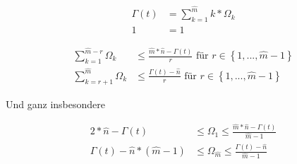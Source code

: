 \vspace{0.6cm}
\vspace{1cm}













\begin{Theorem}\label{theremPartiotionVsGamma}
\vspace{0.3cm}

\begin{align*}
\Gamma(t)&= \sum_{k=1}^{\widehat{m}} k * \Omega_k \tag{i} \\ 
1 &= 1 \tag{ii} 
\end{align*}

\end{Theorem}
\vspace{0.3cm}


\begin{Theorem}\label{theremAbschaetzung}
\vspace{0.3cm}

\begin{align*}
\sum_{k=1}^{\widehat{m} - r} \Omega_k &\leq \frac{\widehat{m} * \widehat{n} - \Gamma(t)}{r} \textrm{ für } r \in \left\{1,...,\widehat{m} - 1 \right\} \tag{i} \\ 
\sum_{k=r+1}^{\widehat{m}} \Omega_k &\leq \frac{\Gamma(t) - \widehat{n}}{r} \textrm{ für } r \in \left\{1,...,\widehat{m} - 1 \right\} \tag{ii} 
\end{align*}

Und ganz insbesondere

\begin{align*}
2 * \widehat{n} - \Gamma(t) &\leq \Omega_1 \leq \frac{\widehat{m} * \widehat{n} - \Gamma(t)}{\widehat{m} - 1} \tag{iii} \\ 
\Gamma(t) - \widehat{n} * \left( \widehat{m} - 1 \right) &\leq \Omega_{\widehat{m}} \leq \frac{\Gamma(t) - \widehat{n}}{\widehat{m} - 1} \tag{iv} 
\end{align*}

\end{Theorem}
\vspace{0.6cm}






\vspace{0.6cm}
\todo{[Beispiel]}
\vspace{0.6cm}


